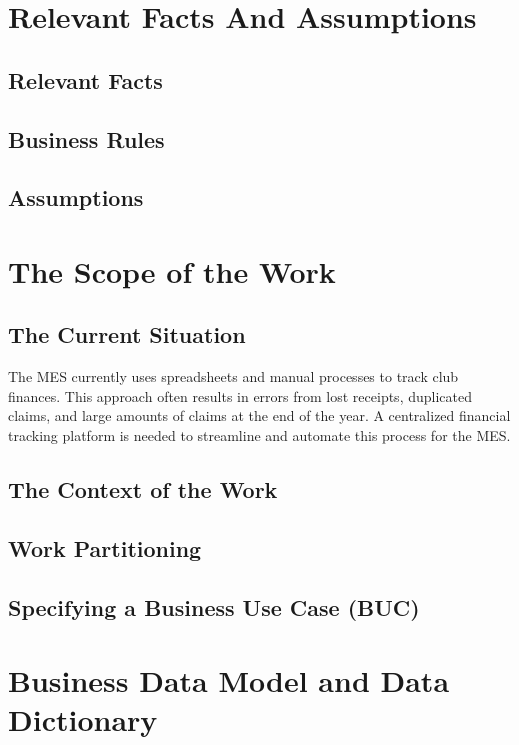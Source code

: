 \documentclass[12pt]{article}
\begin{document}
\section{Relevant Facts And Assumptions}
  \subsection{Relevant Facts}
  \subsection{Business Rules}
  \subsection{Assumptions}

\section{The Scope of the Work}
  \subsection{The Current Situation}
    The MES currently uses spreadsheets and manual processes
    to track club finances. This approach often results in errors from lost receipts,
    duplicated claims, and large amounts of claims at the end of the year. A centralized
    financial tracking platform is needed to streamline and automate
    this process for the MES.

  \subsection{The Context of the Work}
  \subsection{Work Partitioning}
  \subsection{Specifying a Business Use Case (BUC)}

\section{Business Data Model and Data Dictionary}
\end{document}
